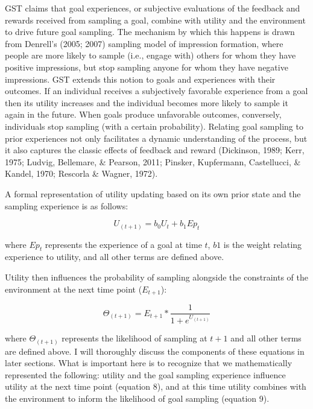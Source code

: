 \documentclass[english,man]{apa6}
\theoremstyle{definition}
\theoremstyle{definition}
\theoremstyle{definition}
\theoremstyle{remark}
\begin{document}
GST claims that goal experiences, or subjective evaluations of the
feedback and rewards received from sampling a goal, combine with utility
and the environment to drive future goal sampling. The mechanism by
which this happens is drawn from Denrell's (2005; 2007) sampling model
of impression formation, where people are more likely to sample (i.e.,
engage with) others for whom they have positive impressions, but stop
sampling anyone for whom they have negative impressions. GST extends
this notion to goals and experiences with their outcomes. If an
individual receives a subjectively favorable experience from a goal then
its utility increases and the individual becomes more likely to sample
it again in the future. When goals produce unfavorable outcomes,
conversely, individuals stop sampling (with a certain probability).
Relating goal sampling to prior experiences not only facilitates a
dynamic understanding of the process, but it also captures the classic
effects of feedback and reward (Dickinson, 1989; Kerr, 1975; Ludvig,
Bellemare, \& Pearson, 2011; Pinsker, Kupfermann, Castellucci, \&
Kandel, 1970; Rescorla \& Wagner, 1972).

A formal representation of utility updating based on its own prior state
and the sampling experience is as follows:

\begin{equation}
U_{(t+1)} = b_0 U_{t} + b_1 Ep_t
\end{equation}

\noindent where \(Ep_t\) represents the experience of a goal at time
\(t\), \(b1\) is the weight relating experience to utility, and all
other terms are defined above.

Utility then influences the probability of sampling alongside the
constraints of the environment at the next time point (\(E_{t+1}\)):

\begin{equation}
\Theta_{(t+1)} = E_{t+1} * {\frac {1}{1 + e^{U_{(t+1)}}}}
\end{equation}

\noindent where \(\Theta_{(t+1)}\) represents the likelihood of sampling
at \(t+1\) and all other terms are defined above. I will thoroughly
discuss the components of these equations in later sections. What is
important here is to recognize that we mathematically represented the
following: utility and the goal sampling experience influence utility at
the next time point (equation 8), and at this time utility combines with
the environment to inform the likelihood of goal sampling (equation 9).
\end{document}

